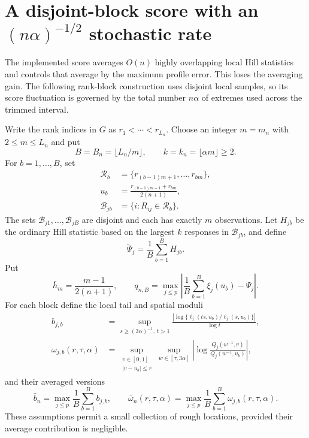 \documentclass[11pt]{article}
\theoremstyle{definition}\newtheorem{definition}[theorem]{Definition}
\begin{document}
\section{A disjoint-block score with an $(n\alpha)^{-1/2}$ stochastic rate}

The implemented score averages $O(n)$ highly overlapping local Hill
statistics and controls that average by the maximum profile error.  This loses
the averaging gain.  The following rank-block construction uses disjoint
local samples, so its score fluctuation is governed by the total number
$n\alpha$ of extremes used across the trimmed interval.

Write the rank indices in $G$ as
$r_1<\cdots<r_{L_n}$.  Choose an integer $m=m_n$ with
$2\le m\le L_n$ and put
\[
 B=B_n=\lfloor L_n/m\rfloor,
 \qquad k=k_n=\lfloor\alpha m\rfloor\ge2.
\]
For $b=1,\ldots,B$, set
\begin{align*}
 \mathcal R_b&=\{r_{(b-1)m+1},\ldots,r_{bm}\},\\
 u_b&=\frac{r_{(b-1)m+1}+r_{bm}}{2(n+1)},\\
 \mathcal B_{jb}&=\{i:R_{ij}\in\mathcal R_b\}.
\end{align*}
The sets $\mathcal B_{j1},\ldots,\mathcal B_{jB}$ are disjoint and each has
exactly $m$ observations.  Let $H_{jb}$ be the ordinary Hill statistic based
on the largest $k$ responses in $\mathcal B_{jb}$, and define
\begin{equation}
 \widetilde\Psi_j=\frac1B\sum_{b=1}^B H_{jb}.
 \label{eq:block-score}
\end{equation}
Put
\begin{equation}
 \bar h_m=\frac{m-1}{2(n+1)},
 \qquad
 q_{n,B}=\max_{j\le p}\left|
 \frac1B\sum_{b=1}^B\xi_j(u_b)-\Psi_j\right|.
 \label{eq:block-quadrature}
\end{equation}
For each block define the local tail and spatial moduli
\begin{align}
 b_{j,b}
 &=\sup_{s\ge(3\alpha)^{-1},\,t>1}
   \frac{|\log\{\ell_j(ts,u_b)/\ell_j(s,u_b)\}|}{\log t},
 \label{eq:block-tail-modulus}\\
 \omega_{j,b}(r,\tau,\alpha)
 &=\sup_{\substack{v\in[0,1]\\|v-u_b|\le r}}
   \sup_{w\in[\tau,3\alpha]}
   \left|\log\frac{Q_j(w^{-1},v)}{Q_j(w^{-1},u_b)}\right|,
 \label{eq:block-spatial-modulus}
\end{align}
and their averaged versions
\begin{equation}
 \bar b_n=\max_{j\le p}\frac1B\sum_{b=1}^B b_{j,b},
 \qquad
 \bar\omega_n(r,\tau,\alpha)
 =\max_{j\le p}\frac1B\sum_{b=1}^B
   \omega_{j,b}(r,\tau,\alpha).
 \label{eq:average-moduli}
\end{equation}
These assumptions permit a small collection of rough locations, provided
their average contribution is negligible.
\end{document}
